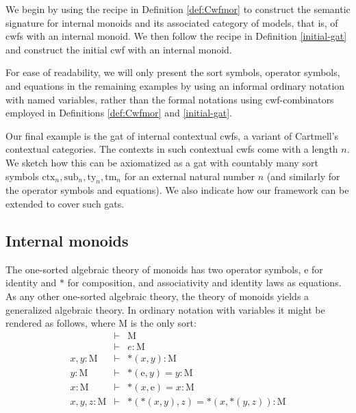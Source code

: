 \documentclass{lmcs}
\def\Mon{\mathrm{M}}
\def\idmon{\mathrm{e}}
\def\comp{\mathrm{*}}
\newcommand{\ctx}{\mathrm{ctx}}
\newcommand{\sub}{\mathrm{sub}}
\newcommand{\ty}{\mathrm{ty}}
\newcommand{\tm}{\mathrm{tm}}
\begin{document}
We begin by using the recipe in Definition \ref{def:Cwfmor} to construct the semantic signature for internal monoids and its associated category of models, that is, of cwfs with an internal monoid. We then follow the recipe in Definition \ref{initial-gat} and construct the initial cwf with an internal monoid. 

For ease of readability, we will only present the sort symbols, operator symbols, and equations in the remaining examples by using an informal ordinary notation with named variables, rather than the formal notations using cwf-combinators employed in Definitions \ref{def:Cwfmor} and \ref{initial-gat}.

Our final example is the gat of internal contextual cwfs, a variant of Cartmell's contextual categories. The contexts in such contextual cwfs come with a length $n$. We sketch how this can be axiomatized as a gat with countably many sort symbols $\ctx_n, \sub_n, \ty_n, \tm_n$ for an external natural number $n$ (and similarly for the operator symbols and equations). We also indicate how our framework can be extended to cover such gats.

\subsection{Internal monoids}\label{monoids}
 The one-sorted algebraic theory of monoids has two operator symbols,
$\idmon$ for identity and $\comp$ for composition, and associativity and identity laws as equations.
As any other one-sorted algebraic theory, the theory of monoids yields a
generalized algebraic theory. In ordinary notation with variables it might be rendered as follows, where $\Mon$ is the only sort:
\begin{eqnarray*}
&\vdash& \Mon\\
&\vdash& e : \Mon\\
x, y : \Mon &\vdash& \comp(x,y) : \Mon\\
y : \Mon &\vdash& \comp(\idmon,y) = y : \Mon\\
x : \Mon &\vdash& \comp(x,\idmon) = x : \Mon\\
x, y, z : \Mon &\vdash& \comp(\comp(x,y),z) = \comp(x,\comp(y,z)) : \Mon
\end{eqnarray*}
\end{document}
